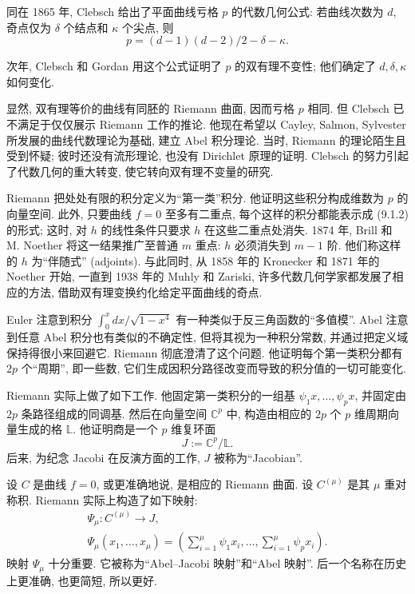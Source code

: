 同在 1865 年, Clebsch 给出了平面曲线亏格 $p$ 的代数几何公式: 若曲线次数为 $d$, 奇点仅为 $\delta$ 个结点和 $\kappa$ 个尖点, 则
\[
p=(d-1)(d-2)/2-\delta-\kappa.
\]

次年, Clebsch 和 Gordan 用这个公式证明了 $p$ 的双有理不变性; 他们确定了 $d,\delta,\kappa$ 如何变化.

显然, 双有理等价的曲线有同胚的 Riemann 曲面, 因而亏格 $p$ 相同. 但 Clebsch 已不满足于仅仅展示 Riemann 工作的推论. 他现在希望以 Cayley, Salmon, Sylvester 所发展的曲线代数理论为基础, 建立 Abel 积分理论. 当时, Riemann 的理论陌生且受到怀疑; 彼时还没有流形理论, 也没有 Dirichlet 原理的证明. Clebsch 的努力引起了代数几何的重大转变, 使它转向双有理不变量的研究.

Riemann 把处处有限的积分定义为“第一类”积分. 他证明这些积分构成维数为 $p$ 的向量空间. 此外, 只要曲线 $f=0$ 至多有二重点, 每个这样的积分都能表示成 (9.1.2) 的形式; 这时, 对 $h$ 的线性条件只要求 $h$ 在这些二重点处消失. 1874 年, Brill 和 M. Noether 将这一结果推广至普通 $m$ 重点: $h$ 必须消失到 $m-1$ 阶. 他们称这样的 $h$ 为“伴随式” (adjoints). 与此同时, 从 1858 年的 Kronecker 和 1871 年的 Noether 开始, 一直到 1938 年的 Muhly 和 Zariski, 许多代数几何学家都发展了相应的方法, 借助双有理变换约化给定平面曲线的奇点.

Euler 注意到积分 $\int_0^x dx/\sqrt{1-x^4}$ 有一种类似于反三角函数的“多值模”. Abel 注意到任意 Abel 积分也有类似的不确定性, 但将其视为一种积分常数, 并通过把定义域保持得很小来回避它. Riemann 彻底澄清了这个问题. 他证明每个第一类积分都有 $2p$ 个“周期”, 即一些数, 它们生成因积分路径改变而导致的积分值的一切可能变化.

Riemann 实际上做了如下工作. 他固定第一类积分的一组基 $\psi_1x,\ldots,\psi_px$, 并固定由 $2p$ 条路径组成的同调基. 然后在向量空间 $\mathbb C^p$ 中, 构造由相应的 $2p$ 个 $p$ 维周期向量生成的格 $\mathbb L$. 他证明商是一个 $p$ 维复环面
\[
J:=\mathbb C^p/\mathbb L.
\]
后来, 为纪念 Jacobi 在反演方面的工作, $J$ 被称为“Jacobian”.

设 $C$ 是曲线 $f=0$, 或更准确地说, 是相应的 Riemann 曲面. 设 $C^{(\mu)}$ 是其 $\mu$ 重对称积. Riemann 实际上构造了如下映射:
\[
\begin{gathered}
\Psi_\mu:C^{(\mu)}\longrightarrow J,\\
\Psi_\mu(x_1,\ldots,x_\mu)=\left(\sum_{i=1}^\mu\psi_1x_i,\ldots,\sum_{i=1}^\mu\psi_px_i\right).
\end{gathered}
\]
映射 $\Psi_\mu$ 十分重要. 它被称为“Abel--Jacobi 映射”和“Abel 映射”. 后一个名称在历史上更准确, 也更简短, 所以更好.

